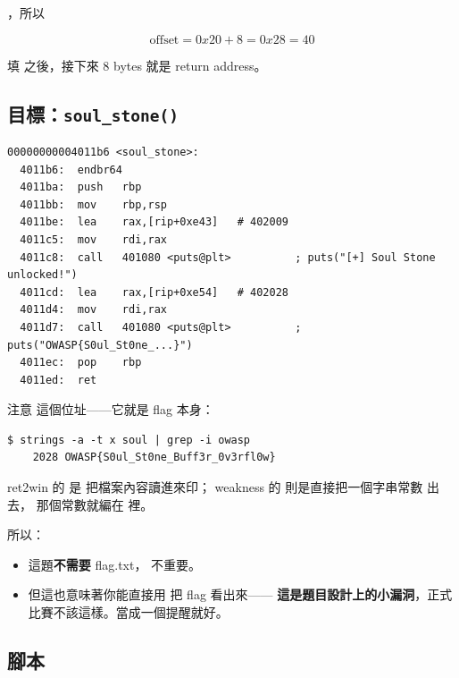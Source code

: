 \begin{keybox}
，所以

\[
\text{offset} = 0x20 + 8 = 0x28 = 40
\]

填  之後，接下來 8 bytes 就是 return address。
\end{keybox}

\subsection{目標：\texttt{soul\_stone()}}

\begin{lstlisting}[style=asm]
00000000004011b6 <soul_stone>:
  4011b6:  endbr64
  4011ba:  push   rbp
  4011bb:  mov    rbp,rsp
  4011be:  lea    rax,[rip+0xe43]   # 402009
  4011c5:  mov    rdi,rax
  4011c8:  call   401080 <puts@plt>          ; puts("[+] Soul Stone unlocked!")
  4011cd:  lea    rax,[rip+0xe54]   # 402028
  4011d4:  mov    rdi,rax
  4011d7:  call   401080 <puts@plt>          ; puts("OWASP{S0ul_St0ne_...}")
  4011ec:  pop    rbp
  4011ed:  ret
\end{lstlisting}

注意  這個位址——它就是 flag 本身：

\begin{lstlisting}[style=raw]
$ strings -a -t x soul | grep -i owasp
    2028 OWASP{S0ul_St0ne_Buff3r_0v3rfl0w}
\end{lstlisting}

\begin{whybox}
ret2win 的  是  把檔案內容讀進來印；
weakness 的  則是直接把一個字串常數  出去，
那個常數就編在  裡。

所以：
\begin{itemize}[leftmargin=1.4em,itemsep=1pt]
  \item 這題\textbf{不需要} flag.txt， 不重要。
  \item 但這也意味著你能直接用  把 flag 看出來——
        \textbf{這是題目設計上的小漏洞}，正式比賽不該這樣。當成一個提醒就好。
\end{itemize}
\end{whybox}

\subsection{腳本}

